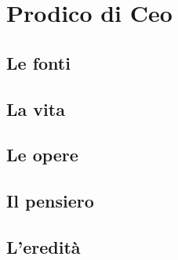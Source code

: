 \chapter{Prodico di Ceo}

\section{Le fonti}

\section{La vita}

\section{Le opere}

\section{Il pensiero}

\section{L'eredità}

